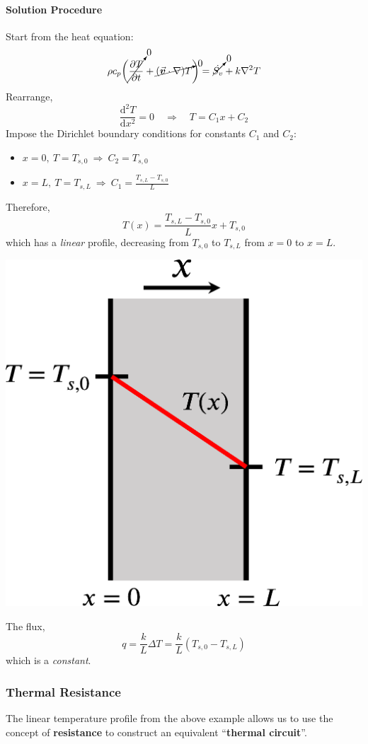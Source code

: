 \documentclass[12pt, a4paper]{article}
\numberwithin{equation}{subsection}
\begin{document}
\begin{tcolorbox}[breakable, title = \textbf{Example: 1-D Steady-State Conduction}]
\paragraph{Solution Procedure} Start from the heat equation:
\[ 
    \rho c_{p}\bigg( \cancelto{0}{\frac{\partial T}{\partial t}} +\cancelto{0}{(\vec{\bm{v}} \cdot \nabla) T} \bigg) = \cancelto{0}{\dot{S_{v}}} +k \nabla^{2} T 
\]
Rearrange,
\[ 
    \frac{\mathrm{d}^{2} T}{\mathrm{d} x^{2}}=0 \quad \Rightarrow \quad T = C_{1}x + C_{2} 
\]
Impose the Dirichlet boundary conditions for constants $C_1$ and $C_2$: 
\begin{itemize}
    \item $\displaystyle x=0, \ T = T_{s,0} \ \Rightarrow \ C_{2} = T_{s,0}$ 
    \item $\displaystyle x=L, \ T = T_{s, L} \ \Rightarrow \ C_{1}=\frac{T_{s,L}-T_{s,0}}{L}$
\end{itemize}
Therefore,
\[ 
    T(x) = \frac{T_{s,L}-T_{s,0}}{L} x + T_{s,0}
\]
which has a \textit{linear} profile, decreasing from $T_{s,0}$ to $T_{s, L}$ from $x=0$ to $x=L$. 
\begin{center}
    \includegraphics[width=.4\textwidth]{img/oneD_conduction_wall_solution.eps}
\end{center}

The flux, 
\[ 
    q = \frac{k}{L} \Delta T = \frac{k}{L} (T_{s,0}-T_{s,L}) 
\]
which is a \textit{constant}.
\end{tcolorbox}

\subsubsection{Thermal Resistance}
The linear temperature profile from the above example allows us to use the concept of \textbf{resistance} to construct an equivalent ``\textbf{thermal circuit}''.
\end{document}
